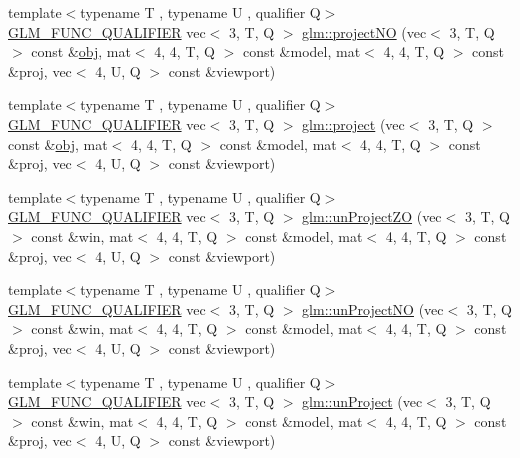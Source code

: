 \begin{DoxyCompactItemize}
\item 
{\footnotesize template$<$typename T , typename U , qualifier Q$>$ }\\\mbox{\hyperlink{setup_8hpp_a33fdea6f91c5f834105f7415e2a64407}{G\+L\+M\+\_\+\+F\+U\+N\+C\+\_\+\+Q\+U\+A\+L\+I\+F\+I\+ER}} vec$<$ 3, T, Q $>$ \mbox{\hyperlink{group__gtc__matrix__transform_ga05249751f48d14cb282e4979802b8111}{glm\+::project\+NO}} (vec$<$ 3, T, Q $>$ const \&\mbox{\hyperlink{_s_d_l__opengl__glext_8h_a0c0d4701a6c89f4f7f0640715d27ab26}{obj}}, mat$<$ 4, 4, T, Q $>$ const \&model, mat$<$ 4, 4, T, Q $>$ const \&proj, vec$<$ 4, U, Q $>$ const \&viewport)
\item 
{\footnotesize template$<$typename T , typename U , qualifier Q$>$ }\\\mbox{\hyperlink{setup_8hpp_a33fdea6f91c5f834105f7415e2a64407}{G\+L\+M\+\_\+\+F\+U\+N\+C\+\_\+\+Q\+U\+A\+L\+I\+F\+I\+ER}} vec$<$ 3, T, Q $>$ \mbox{\hyperlink{group__gtc__matrix__transform_gaf36e96033f456659e6705472a06b6e11}{glm\+::project}} (vec$<$ 3, T, Q $>$ const \&\mbox{\hyperlink{_s_d_l__opengl__glext_8h_a0c0d4701a6c89f4f7f0640715d27ab26}{obj}}, mat$<$ 4, 4, T, Q $>$ const \&model, mat$<$ 4, 4, T, Q $>$ const \&proj, vec$<$ 4, U, Q $>$ const \&viewport)
\item 
{\footnotesize template$<$typename T , typename U , qualifier Q$>$ }\\\mbox{\hyperlink{setup_8hpp_a33fdea6f91c5f834105f7415e2a64407}{G\+L\+M\+\_\+\+F\+U\+N\+C\+\_\+\+Q\+U\+A\+L\+I\+F\+I\+ER}} vec$<$ 3, T, Q $>$ \mbox{\hyperlink{group__gtc__matrix__transform_gade5136413ce530f8e606124d570fba32}{glm\+::un\+Project\+ZO}} (vec$<$ 3, T, Q $>$ const \&win, mat$<$ 4, 4, T, Q $>$ const \&model, mat$<$ 4, 4, T, Q $>$ const \&proj, vec$<$ 4, U, Q $>$ const \&viewport)
\item 
{\footnotesize template$<$typename T , typename U , qualifier Q$>$ }\\\mbox{\hyperlink{setup_8hpp_a33fdea6f91c5f834105f7415e2a64407}{G\+L\+M\+\_\+\+F\+U\+N\+C\+\_\+\+Q\+U\+A\+L\+I\+F\+I\+ER}} vec$<$ 3, T, Q $>$ \mbox{\hyperlink{group__gtc__matrix__transform_gae089ba9fc150ff69c252a20e508857b5}{glm\+::un\+Project\+NO}} (vec$<$ 3, T, Q $>$ const \&win, mat$<$ 4, 4, T, Q $>$ const \&model, mat$<$ 4, 4, T, Q $>$ const \&proj, vec$<$ 4, U, Q $>$ const \&viewport)
\item 
{\footnotesize template$<$typename T , typename U , qualifier Q$>$ }\\\mbox{\hyperlink{setup_8hpp_a33fdea6f91c5f834105f7415e2a64407}{G\+L\+M\+\_\+\+F\+U\+N\+C\+\_\+\+Q\+U\+A\+L\+I\+F\+I\+ER}} vec$<$ 3, T, Q $>$ \mbox{\hyperlink{group__gtc__matrix__transform_ga36641e5d60f994e01c3d8f56b10263d2}{glm\+::un\+Project}} (vec$<$ 3, T, Q $>$ const \&win, mat$<$ 4, 4, T, Q $>$ const \&model, mat$<$ 4, 4, T, Q $>$ const \&proj, vec$<$ 4, U, Q $>$ const \&viewport)

\end{DoxyCompactItemize}
